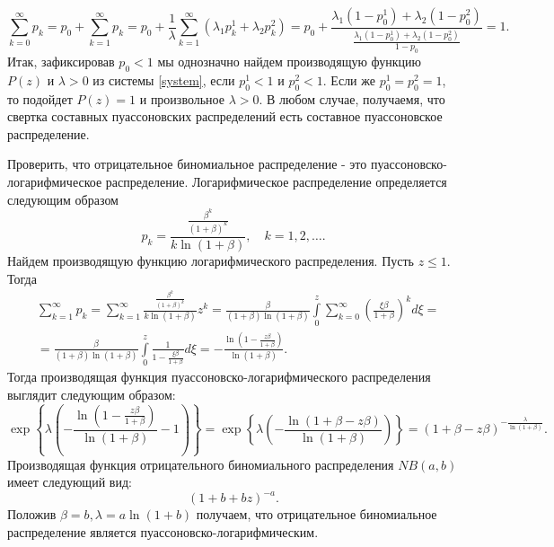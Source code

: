             \begin{equation*}
                \sum _{k=0}^\infty p_k = p_0 + \sum _{k=1}^\infty p_k = p_0 + \frac1\lambda \sum _{k=1}^\infty \left( \lambda_1 p_k^1 + \lambda_2 p_k^2 \right) = p_0 + \frac{\lambda_1 (1 - p_0^1) + \lambda_2 ( 1 - p_0^2)}{\frac{\lambda_1(1 - p_0^1) + \lambda_2 ( 1 - p_0^2)}{1 - p_0}} = 1.
            \end{equation*}
            Итак, зафиксировав $p_0 < 1$ мы однозначно найдем производящую функцию $P(z)$ и $\lambda>0$ из системы \eqref{system}, если $p_0^1<1$ и  $p_0^2 < 1$. Если же $p_0^1=p_0^2 = 1$, то подойдет $P(z) = 1$ и произвольное $\lambda > 0$. В любом случае, получаемя, что свертка составных пуассоновских распределений есть составное пуассоновское распределение.

    \problem{}
        Проверить, что отрицательное биномиальное распределение - это пуассоновско-логарифмическое распределение. 
        \solution{}
            Логарифмическое распределение определяется следующим образом
            \begin{equation*}
                p_k = \frac{\frac{\beta^k}{(1+\beta)^k}}{k\ln(1 + \beta)}, \quad k=1,2,\ldots.
            \end{equation*}
            Найдем производящую функцию логарифмического распределения. Пусть $z\leq 1$. Тогда
            \begin{align*}
                &\sum\limits_{k=1}^\infty p_k = \sum\limits_{k=1}^\infty \frac{\frac{\beta^k}{(1+\beta)^k}}{k\ln(1 + \beta)}z^k = \frac{\beta}{(1+\beta)\ln(1 + \beta)} \int\limits_0^z 
                \sum\limits_{k=0}^\infty \left( \frac{\xi \beta}{1 + \beta} \right)^k d\xi= \\
                &= \frac{\beta}{(1+\beta)\ln(1 + \beta)} \int\limits_0^z \frac1{1 - \frac{\xi \beta}{1 + \beta}} d\xi
                = -\frac{\ln(1 - \frac{z \beta}{1 + \beta} )}{\ln(1+\beta)}.
            \end{align*}
            Тогда производящая функция пуассоновско-логарифмического распределения выглядит следующим образом:
            \begin{equation*}
                \exp\left\{ \lambda\left(-\frac{\ln(1 - \frac{z \beta}{1 + \beta} )}{\ln(1+\beta)} - 1\right) \right\} =  \exp\left\{ \lambda\left(-\frac{\ln(1 + \beta - z \beta )}{\ln(1+\beta)}\right) \right\} = \left(1 + \beta - z \beta \right)^{-\frac{\lambda}{\ln(1 + \beta)}}.
            \end{equation*}
            Производящая функция отрицательного биномиального распределения $NB(a,b)$ имеет следующий вид:
            \begin{equation*}
                (1+b+bz)^{-a}.
            \end{equation*}
            Положив $\beta = b, \lambda = a\ln(1+b)$ получаем, что отрицательное биномиальное распределение является пуассоновско-логарифмическим.
    
